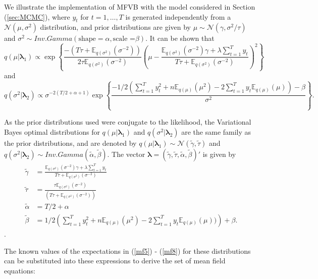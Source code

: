 \documentclass[12pt,a4paper]{article}%
\numberwithin{equation}{section}
\begin{document}
We illustrate the implementation of MFVB with the model considered in Section (\ref{sec:MCMC}), where $y_t$ for $t = 1, \dots, T$ is generated independently from a $\mathcal{N}(\mu, \sigma^2)$ distribution, and prior distributions are given by $\mu \sim \mathcal{N}(\gamma, \sigma^2 / \tau)$ and $\sigma^2 \sim Inv.Gamma(\mbox{shape} = \alpha, \mbox{scale =}\beta)$. It can be shown that
\begin{equation}
\label{mf3}
q(\mu | \boldsymbol{\lambda}_1) \propto \exp \left\{ \frac{-(T\tau + \mathbb{E}_{q(\sigma^2)}(\sigma^{-2}))}{2\tau\mathbb{E}_{q(\sigma^2)}(\sigma^{-2})} \left( \mu - \frac{\mathbb{E}_{q(\sigma^2)}(\sigma^{-2})\gamma + \lambda \sum_{t=1}^{T} y_t}{T \tau + \mathbb{E}_{q(\sigma^2 )}(\sigma^{-2})} \right)^2 \right\}
\end{equation}
and
\begin{equation}
\label{mf4}
q(\sigma^2 | \boldsymbol{\lambda}_2) \propto \sigma^{-2(T/2 + \alpha + 1)} \exp \left\{ \frac{ -1/2(\sum_{t=1}^{T}y_t^2 + n\mathbb{E}_{q(\mu)}(\mu^2) - 2\sum_{t=1}^{T} y_t \mathbb{E}_{q(\mu)}(\mu)) - \beta}{\sigma^2} \right\}.
\end{equation}

As the prior distributions used were conjugate to the likelihood, the Variational Bayes optimal distributions for $q(\mu |  \boldsymbol{\lambda}_1)$ and $q(\sigma^2 | \boldsymbol{\lambda}_2)$ are the same family as the prior distributions, and are denoted by $q(\mu | \boldsymbol{\lambda}_1) \sim \mathcal{N}(\tilde{\gamma}, \tilde{\tau})$ and $q(\sigma^2 | \boldsymbol{\lambda}_2) \sim Inv.Gamma(\tilde{\alpha}, \tilde{\beta})$. The vector $\boldsymbol{\lambda} = (\tilde{\gamma}, \tilde{\tau}, \tilde{\alpha}, \tilde{\beta})'$ is given by
\begin{align}
\tilde{\gamma} &= \frac{\mathbb{E}_{q(\sigma^2)}(\sigma^{-2})\gamma + \lambda \sum_{t=1}^{T} y_t}{T \tau + \mathbb{E}_{q(\sigma^2 )}(\sigma^{-2})}  \label{mf5} \\ 
\tilde{\tau} &= \frac{\tau\mathbb{E}_{q(\sigma^2)}(\sigma^{-2})}{(T\tau + \mathbb{E}_{q(\sigma^2)}(\sigma^{-2}))} \label{mf6} \\
\tilde{\alpha} &= T/2 + \alpha  \label{mf7} \\
\tilde{\beta} &= 1/2\left(\sum_{t=1}^{T}y_t^2 + n\mathbb{E}_{q(\mu)}(\mu^2) - 2\sum_{t=1}^{T} y_t \mathbb{E}_{q(\mu)}(\mu))\right) + \beta. \label{mf8}
\end{align}.

The known values of the expectations in (\ref{mf5}) - (\ref{mf8}) for these distributions can be substituted into these expressions to derive the set of mean field equations:
\end{document}
